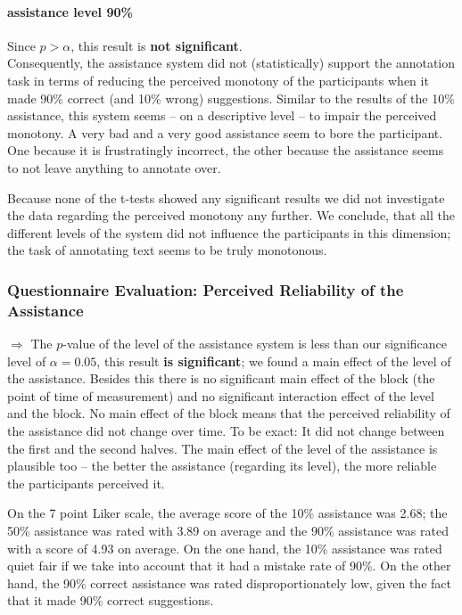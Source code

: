 		\paragraph{assistance level 90\%}
		Since \(p > \alpha\), this result is \textbf{not significant}.\\
		Consequently, the assistance system did not (statistically) support the annotation task in terms of reducing the perceived monotony of the participants when it made 90\% correct (and 10\% wrong) suggestions. Similar to the results of the 10\% assistance, this system seems -- on a descriptive level -- to impair the perceived monotony. A very bad and a very good assistance seem to bore the participant. One because it is frustratingly incorrect, the other because the assistance seems to not leave anything to annotate over.

		Because none of the t-tests showed any significant results we did not investigate the data regarding the perceived monotony any further. We conclude, that all the different levels of the system did not influence the participants in this dimension; the task of annotating text seems to be truly monotonous.

	\subsubsection{Questionnaire Evaluation: Perceived Reliability of the Assistance}
		\(\Rightarrow\) The \(p\)-value of the level of the assistance system is less than our significance level of \(\alpha = 0.05\), this result \textbf{is significant}; we found a main effect of the level of the assistance. Besides this there is no significant main effect of the block (the point of time of measurement) and no significant interaction effect of the level and the block. No main effect of the block means that the perceived reliability of the assistance did not change over time. To be exact: It did not change between the first and the second halves. The main effect of the level of the assistance is plausible too -- the better the assistance (regarding its level), the more reliable the participants perceived it.

		On the 7 point Liker scale, the average score of the 10\% assistance was 2.68; the 50\% assistance was rated with 3.89 on average and the 90\% assistance was rated with a score of 4.93 on average. On the one hand, the 10\% assistance was rated quiet fair if we take into account that it had a mistake rate of 90\%. On the other hand, the 90\% correct assistance was rated disproportionately low, given the fact that it made 90\% correct suggestions.

